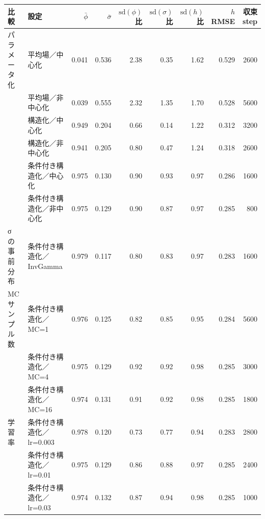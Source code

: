 \begin{tabular}{llrrrrrrr}
\toprule
比較 & 設定 & $\bar\phi$ & $\bar\sigma$ & $\mathrm{sd}(\phi)$比 & $\mathrm{sd}(\sigma)$比 & $\mathrm{sd}(h)$比 & $h$ RMSE & 収束step \\
\midrule
パラメータ化 & 平均場／中心化 & 0.041 & 0.536 & 2.38 & 0.35 & 1.62 & 0.529 & 2600 \\
 & 平均場／非中心化 & 0.039 & 0.555 & 2.32 & 1.35 & 1.70 & 0.528 & 5600 \\
 & 構造化／中心化 & 0.949 & 0.204 & 0.66 & 0.14 & 1.22 & 0.312 & 3200 \\
 & 構造化／非中心化 & 0.941 & 0.205 & 0.80 & 0.47 & 1.24 & 0.318 & 2600 \\
 & 条件付き構造化／中心化 & 0.975 & 0.130 & 0.90 & 0.93 & 0.97 & 0.286 & 1600 \\
 & 条件付き構造化／非中心化 & 0.975 & 0.129 & 0.90 & 0.87 & 0.97 & 0.285 & 800 \\
\addlinespace
σ の事前分布 & 条件付き構造化／InvGamma & 0.979 & 0.117 & 0.80 & 0.83 & 0.97 & 0.283 & 1600 \\
\addlinespace
MC サンプル数 & 条件付き構造化／MC=1 & 0.976 & 0.125 & 0.82 & 0.85 & 0.95 & 0.284 & 5600 \\
 & 条件付き構造化／MC=4 & 0.975 & 0.129 & 0.92 & 0.92 & 0.98 & 0.285 & 3000 \\
 & 条件付き構造化／MC=16 & 0.974 & 0.131 & 0.91 & 0.92 & 0.98 & 0.285 & 1800 \\
\addlinespace
学習率 & 条件付き構造化／lr=0.003 & 0.978 & 0.120 & 0.73 & 0.77 & 0.94 & 0.283 & 2800 \\
 & 条件付き構造化／lr=0.01 & 0.975 & 0.129 & 0.86 & 0.88 & 0.97 & 0.285 & 2400 \\
 & 条件付き構造化／lr=0.03 & 0.974 & 0.132 & 0.87 & 0.94 & 0.98 & 0.285 & 1000 \\
\bottomrule
\end{tabular}
